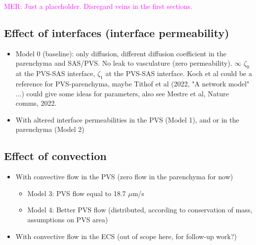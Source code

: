 \documentclass[fleqn,10pt]{wlscirep}
\newcommand{\mer}[1]{\textcolor{magenta}{#1}}
\begin{document}
\mer{MER: Just a placeholder. Disregard veins in the first sections.}


\iffalse
\newpage
\subsection*{Effect of interfaces (interface permeability)}

\begin{itemize}
    \item Model 0 (baseline): only diffusion, different diffusion coefficient in the parenchyma and SAS/PVS. No leak to vasculature (zero permeability). $\infty$ $\zeta_0$ at the PVS-SAS interface, $\zeta_1$ at the PVS-SAS interface. Koch et al could be a reference for PVS-parenchyma, maybe Tithof et al (2022, "A network model" ...) could give some ideas for parameters, also see Mestre et al, Nature comms, 2022. 
    \item 
    With altered interface permeabilities in the PVS (Model 1), and or in the parenchyma (Model 2) 
    \end{itemize}

\begin{figure}
    \caption{}
    \label{fig:1}
\end{figure}

\subsection*{Effect of convection}
\begin{itemize}
    \item 
    With convective flow in the PVS (zero flow in the parenchyma for now)
    \begin{itemize}
        \item 
        Model 3: PVS flow equal to 18.7 $\mu$m/s
        \item 
        Model 4: Better PVS flow (distributed, according to conservation of mass, assumptions on PVS area)
    \end{itemize}    
    \item 
    With convective flow in the ECS (out of scope here, for follow-up work?)
\end{itemize}
\end{document}
